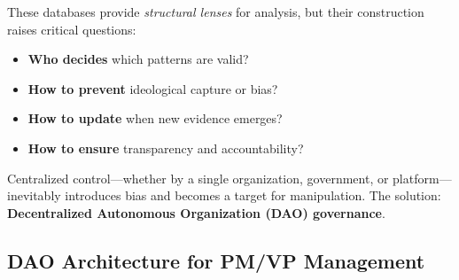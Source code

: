 \documentclass[11pt,a4paper]{article}
\theoremstyle{definition}
\theoremstyle{remark}
\newcommand{\DAO}{\textsc{DAO}}
\begin{document}
These databases provide \textit{structural lenses} for analysis, but their construction raises critical questions:
\begin{itemize}
    \item \textbf{Who decides} which patterns are valid?
    \item \textbf{How to prevent} ideological capture or bias?
    \item \textbf{How to update} when new evidence emerges?
    \item \textbf{How to ensure} transparency and accountability?
\end{itemize}

Centralized control—whether by a single organization, government, or platform—inevitably introduces bias and becomes a target for manipulation. The solution: \textbf{Decentralized Autonomous Organization (\DAO{}) governance}.

\subsection{DAO Architecture for PM/VP Management}
\end{document}
